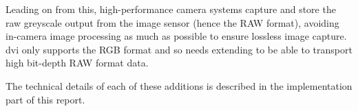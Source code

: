 Leading on from this, high-performance camera systems capture and store the raw greyscale output from the image sensor (hence the RAW format), avoiding in-camera image processing as much as possible to ensure lossless image capture. \gls{dvi} only supports the RGB format and so needs extending to be able to transport high bit-depth RAW format data.
 
The technical details of each of these additions is described in the implementation part of this report.